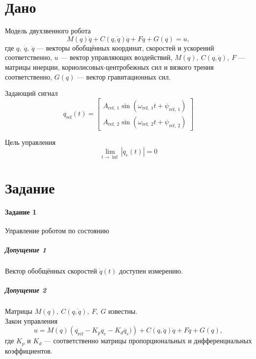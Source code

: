 \documentclass[14pt]{extarticle}
\begin{document}
    

    \section*{Дано}
    Модель двухзвенного робота
    \begin{equation}
        \label{eq:sys}
        M(q)\ddot{q} + C(q, \dot{q})\dot{q} + F\dot{q} +G(q) = u,
    \end{equation}
    где $q,\ \dot{q},\ \ddot{q}$ --- векторы обобщённых координат, скоростей и ускорений соответственно,
    $u$ --- вектор управляющих воздействий,
    $M(q),\ C(q,\dot{q}),\ F$ --- матрицы инерции, кориолисовых-центробежных сил и вязкого трения соответственно,
    $G(q)$ --- вектор гравитационных сил.
    \newline

    Задающий сигнал
    \begin{equation}
        \label{eq:traject}
        q_{\text{ref}}(t) =
        \begin{bmatrix}
            A_{\text{ref},\ 1}\sin(\omega_{\text{ref},\ 1}t + \psi_{\text{ref},\ 1})\\
            A_{\text{ref},\ 2}\sin(\omega_{\text{ref},\ 2}t + \psi_{\text{ref},\ 2})
        \end{bmatrix}
    \end{equation}

    Цель управления
    \begin{equation}
        \label{eq:goal}
        \lim_{t \rightarrow \inf }\left| q_e(t) \right| = 0
    \end{equation}

    \section*{Задание}
    \paragraph*{Задание 1} Управление роботом по состоянию

    \subparagraph{Допущение 1} Вектор обобщённых скоростей $\dot{q}(t)$ доступен измерению.

    \subparagraph{Допущение 2} Матрицы $M(q),\ C(q, \dot{q}),\ F,\ G$ известны. \\

    \noindent Закон управления
    \begin{equation}
        \label{eq:control by speed}
        u = M(q)\left( \ddot{q_\text{ref}} - K_p q_e - K_d\dot{q_e}) \right) + C(q, \dot{q})\dot{q} + F\dot{q} + G(q),
    \end{equation}
    где $K_p$ и $K_d$ --- соответственно матрицы пропорциональных и дифференциальных коэффициентов.
    \newline
\end{document}
